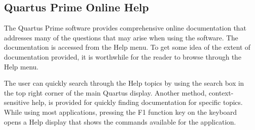 \subsection{Quartus\textsuperscript{\textregistered} Prime Online Help}


The Quartus Prime software provides comprehensive online documentation that addresses
many of the questions that may arise when using the software. The documentation is accessed
from the {\sf Help} menu.  To get some idea of the extent of documentation provided,
it is worthwhile for the reader to browse through the {\sf Help} menu.

The user can quickly search through the {\sf Help} topics by using the 
search box in the top right corner of the main Quartus display.
Another method, context-sensitive help, is provided for quickly finding documentation for
specific topics. While using most applications, pressing the {\sf F1} function
key on the keyboard opens a Help display that
shows the commands available for the application. 
